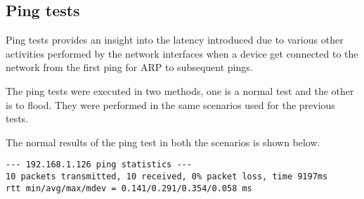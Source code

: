 %	
\subsection{Ping tests}
Ping tests provides an insight into the latency introduced due to various other activities performed by the network interfaces when a device get connected to the network from the first ping for ARP to subsequent pings.

The ping tests were executed in two methods, one is a normal test and the other is to flood. They were performed in the same scenarios used for the previous tests.

The normal results of the ping test in both the scenarios is shown below.
\begin{lstlisting}[caption={Ping Test Without OVS}, label={pingtest_no_ovs}]
--- 192.168.1.126 ping statistics ---
10 packets transmitted, 10 received, 0% packet loss, time 9197ms
rtt min/avg/max/mdev = 0.141/0.291/0.354/0.058 ms
\end{lstlisting}

